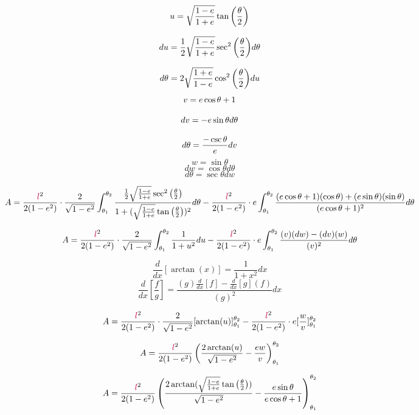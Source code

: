 \scriptsize
\begin{minipage}{\textwidth-15pt}
\begin{multicols}{3}
\noindent
$$u=\sqrt{\frac{1-\textcolor{black}{e}}{1+\textcolor{black}{e}}}\tan{\left(\frac{\theta}{2}\right)}$$

$$du=\frac{1}{2}\sqrt{\frac{1-\textcolor{black}{e}}{1+\textcolor{black}{e}}}\sec^2{\left(\frac{\theta}{2}\right)}d\theta$$

$$d\theta=2\sqrt{\frac{1+\textcolor{black}{e}}{1-\textcolor{black}{e}}}\cos^2{\left(\frac{\theta}{2}\right)}du$$
\columnbreak
$$v=\textcolor{black}{e}\cos{\theta}+1$$

$$dv=-\textcolor{black}{e}\sin{\theta}d\theta$$

$$d\theta=\frac{-\csc{\theta}}{\textcolor{black}{e}}dv$$
\columnbreak
$$w=\sin{\theta}$$
$$dw=\cos{\theta}d\theta$$
$$d\theta=\sec{\theta}dw$$
\columnbreak
\end{multicols}
\end{minipage}
\normalsize

$$A=\frac{\textcolor{purple}{l}^2}{2(1-\textcolor{black}{e}^2)}\cdot
\frac{2}{\sqrt{1-\textcolor{black}{e}^2}}\int_{\theta_1}^{\theta_2}
\frac{\frac{1}{2}\sqrt{\frac{1-\textcolor{black}{e}}{1+\textcolor{black}{e}}}\sec^2{\left(\frac{\theta}{2}\right)}}{1+(\sqrt{\frac{1-\textcolor{black}{e}}{1+\textcolor{black}{e}}}\tan{\left(\frac{\theta}{2}\right)})^2}d\theta
-\frac{\textcolor{purple}{l}^2}{2(1-\textcolor{black}{e}^2)}\cdot\textcolor{black}{e}\int_{\theta_1}^{\theta_2}\frac{(\textcolor{black}{e}\cos{\theta}+1)(\cos{\theta})+(\textcolor{black}{e}\sin{\theta})(\sin{\theta})}{(\textcolor{black}{e}\cos{\theta}+1)^2}d\theta$$

$$A=\frac{\textcolor{purple}{l}^2}{2(1-\textcolor{black}{e}^2)}\cdot
\frac{2}{\sqrt{1-\textcolor{black}{e}^2}}\int_{\theta_1}^{\theta_2}
\frac{1}{1+u^2}du
-\frac{\textcolor{purple}{l}^2}{2(1-\textcolor{black}{e}^2)}\cdot\textcolor{black}{e}\int_{\theta_1}^{\theta_2}\frac{(v)(dw)-(dv)(w)}{(v)^2}d\theta$$

\bigskip
\begin{multicols}{2}
\noindent
$$\frac{d}{dx}[\arctan(x)]=\frac{1}{1+x^2}dx$$
$$\frac{d}{dx}[\frac{f}{g}]=\frac{(g)\frac{d}{dx}[f]-\frac{d}{dx}[g](f)}{(g)^2}dx$$
\end{multicols}

$$A=\frac{\textcolor{purple}{l}^2}{2(1-\textcolor{black}{e}^2)}\cdot
\frac{2}{\sqrt{1-\textcolor{black}{e}^2}}[\arctan(u)]_{\theta_1}^{\theta_2}
-\frac{\textcolor{purple}{l}^2}{2(1-\textcolor{black}{e}^2)}\cdot\textcolor{black}{e}[\frac{w}{v}]_{\theta_1}^{\theta_2}$$

$$A=\frac{\textcolor{purple}{l}^2}{2(1-\textcolor{black}{e}^2)}\left(\frac{2\arctan(u)}{\sqrt{1-\textcolor{black}{e}^2}}
-\frac{\textcolor{black}{\textcolor{black}{e}w}}{v}\right)_{\theta_1}^{\theta_2}$$

$$A=\frac{\textcolor{purple}{l}^2}{2(1-\textcolor{black}{e}^2)} \left(
\frac{2\arctan(\sqrt{\frac{1-\textcolor{black}{e}}{1+\textcolor{black}{e}}}\tan{\left(\frac{\theta}{2}\right)})}{\sqrt{1-\textcolor{black}{e}^2}}
-\frac{\textcolor{black}{e}\sin{\theta}}{\textcolor{black}{e}\cos{\theta}+1}\right)_{\theta_1}^{\theta_2}$$